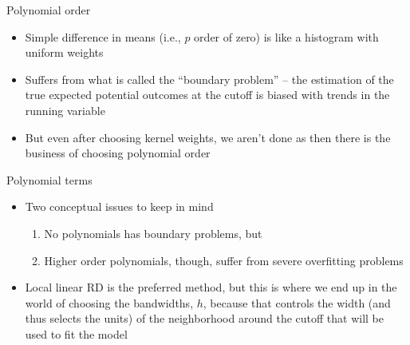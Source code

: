 \documentclass{beamer}
\begin{document}
\begin{frame}{Polynomial order}

\begin{itemize}
\item Simple difference in means (i.e., $p$ order of zero) is like a histogram with uniform weights
\item Suffers from what is called the ``boundary problem'' -- the estimation of the true expected potential outcomes at the cutoff is biased with trends in the running variable
\item But even after choosing kernel weights, we aren't done as then there is the business of choosing polynomial order
\end{itemize}

\end{frame}



\begin{frame}{Polynomial terms}

\begin{itemize}
\item Two conceptual issues to keep in mind
	\begin{enumerate}
	\item No polynomials has boundary problems, but
	\item Higher order polynomials, though, suffer from severe overfitting problems
	\end{enumerate}
\item Local linear RD is the preferred method, but this is where we end up in the world of choosing the bandwidths, $h$, because that controls the width (and thus selects the units) of the neighborhood around the cutoff that will be used to fit the model
\end{itemize}

\end{frame}
\end{document}
